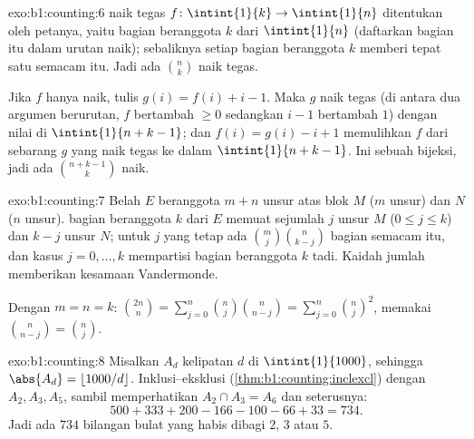\begin{solution}{exo:b1:counting:6}
 naik tegas $f \colon \intint{1}{k} \to \intint{1}{n}$
ditentukan oleh petanya, yaitu  bagian beranggota $k$ dari $\intint{1}{n}$ (daftarkan
 bagian itu dalam urutan naik); sebaliknya setiap  bagian beranggota $k$ memberi tepat
satu  semacam itu. Jadi ada $\binom nk$  naik tegas.

Jika $f$ hanya naik, tulis $g(i) = f(i) + i - 1$. Maka $g$
naik tegas (di antara dua argumen berurutan, $f$ bertambah $\geq 0$
sedangkan $i - 1$ bertambah $1$) dengan nilai di $\intint{1}{n + k - 1}$; dan
$f(i) = g(i) - i + 1$ memulihkan $f$ dari sebarang $g$ yang naik tegas
ke dalam $\intint{1}{n+k-1}$. Ini sebuah bijeksi, jadi ada
$\binom{n + k - 1}{k}$  naik.
\end{solution}

\begin{solution}{exo:b1:counting:7}
Belah  $E$ beranggota $m + n$ unsur atas blok $M$ ($m$ unsur)
dan $N$ ($n$ unsur).  bagian beranggota $k$ dari $E$ memuat sejumlah $j$ unsur
$M$ ($0 \leq j \leq k$) dan $k - j$ unsur $N$; untuk $j$ yang tetap ada
$\binom mj \binom{n}{k-j}$  bagian semacam itu, dan kasus $j = 0, \dots,
k$ mempartisi  bagian beranggota $k$ tadi. Kaidah jumlah memberikan
kesamaan Vandermonde.

Dengan $m = n = k$: $\binom{2n}{n} = \sum_{j=0}^{n} \binom nj
\binom{n}{n-j} = \sum_{j=0}^{n} \binom nj^2$, memakai $\binom{n}{n-j} =
\binom nj$.
\end{solution}

\begin{solution}{exo:b1:counting:8}
Misalkan $A_d$  kelipatan $d$ di $\intint{1}{1000}$, sehingga
$\abs{A_d} = \lfloor 1000/d \rfloor$. Inklusi--eksklusi
(\cref{thm:b1:counting:inclexcl}) dengan $A_2, A_3, A_5$, sambil memperhatikan
$A_2 \cap A_3 = A_6$ dan seterusnya:
\[
500 + 333 + 200 - 166 - 100 - 66 + 33 = 734 .
\]
Jadi ada $734$ bilangan bulat yang habis dibagi $2$, $3$ atau $5$.
\end{solution}

